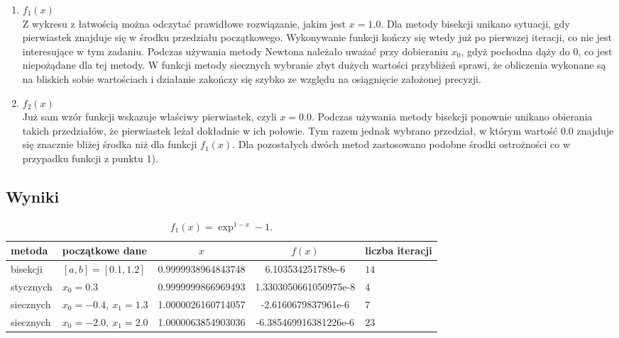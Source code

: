 \documentclass{classrep}
\begin{document}
	
		\begin{enumerate}[1)]
			\item $f_1(x)$ \\
			Z wykresu z łatwością można odczytać prawidłowe rozwiązanie, jakim jest $x=1.0$.
			Dla metody bisekcji unikano sytuacji, gdy pierwiastek znajduje się w środku przedziału początkowego. Wykonywanie funkcji kończy się wtedy już po pierwszej iteracji, co nie jest interesujące w tym zadaniu.
			Podczas używania metody Newtona należało uważać przy dobieraniu $x_0$, gdyż pochodna dąży do $0$, co jest niepożądane dla tej metody.
			W funkcji metody siecznych wybranie zbyt dużych wartości przybliżeń sprawi, że obliczenia wykonane są na bliskich sobie wartościach i działanie zakończy się szybko ze względu na osiągnięcie założonej precyzji.
			
			\item $f_2(x)$ \\
			Już sam wzór funkcji wskazuje właściwy pierwiastek, czyli $x=0.0$. Podczas używania metody bisekcji ponownie unikano obierania takich przedziałów, że pierwiastek leżał dokładnie w ich połowie. Tym razem jednak wybrano przedział, w którym wartość $0.0$ znajduje się znacznie bliżej środka niż dla funkcji $f_1(x)$. 
		Dla pozostałych dwóch metod zastosowano podobne środki ostrożności co w przypadku funkcji z punktu 1).
		\end{enumerate}
		
		
	\subsection{Wyniki}
		\begin{table}[!hpbt]
        		\centering
        		\footnotesize
			\begin{tabular}{llSSl} \toprule
				{metoda} & {początkowe dane} &{$x$} & {$f(x)$} & {liczba iteracji}\\ \midrule
				bisekcji & $[a,b]=[0.1,1.2]$ & 0.9999938964843748 & 6.103534251789e-6 & $14$ \\ 
	 			stycznych & $x_0=0.3$ & 0.9999999866969493 & 1.3303050661050975e-8 & $4$ \\
	 			siecznych & $x_0=-0.4,~x_1=1.3$ & 1.0000026160714057 & -2.6160679837961e-6 & $7$ \\ 
	 			siecznych & $x_0=-2.0,~x_1=2.0$ & 1.0000063854903036 & -6.385469916381226e-6 & $23$ \\ \bottomrule
	 		\end{tabular}
	 		\caption{$f_1(x)=\exp^{1-x}-1$.}
			\label{table:3}
		\end{table}
			
\end{document}
